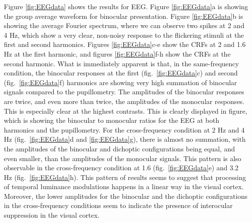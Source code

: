 \documentclass[
]{article}
\begin{document}
Figure \ref{fig:EEGdata} shows the results for EEG. Figure \ref{fig:EEGdata}a is showing the group average waveform for binocular presentation. Figure \ref{fig:EEGdata}b is showing the average Fourier spectrum, where we can observe two spikes at 2 and 4 Hz, which show a very clear, non-noisy response to the flickering stimuli at the first and second harmonics. Figures \ref{fig:EEGdata}c-e show the CRFs at 2 and 1.6 Hz at the first harmonic, and figures \ref{fig:EEGdata}f-h show the CRFs at the second harmonic.
What is immediately apparent is that, in the same-frequency condition, the binocular responses at the first (fig.~\ref{fig:EEGdata}c) and second (fig.~\ref{fig:EEGdata}f) harmonics are showing very high summation of binocular signals compared to the pupillometry. The amplitudes of the binocular responses are twice, and even more than twice, the amplitudes of the monocular responses. This is especially clear at the highest contrasts. This is clearly displayed in figure, which is showing the binocular to monocular ratios for the EEG at both harmonics and the pupillometry. For the cross-frequency condition at 2 Hz and 4 Hz (fig.~\ref{fig:EEGdata}d and \ref{fig:EEGdata}g), there is almost no summation, with the amplitudes of the binocular and dichoptic configurations being equal, and even smaller, than the amplitudes of the monocular signals. This pattern is also observable in the cross-frequency condition at 1.6 (fig.~\ref{fig:EEGdata}e) and 3.2 Hz (fig.~\ref{fig:EEGdata}h). This pattern of results seems to suggest that processing of temporal luminance modulations happens in a linear way in the visual cortex. Moreover, the lower amplitudes for the binocular and the dichoptic configurations in the cross-frequency conditions seem to indicate the presence of interocular suppression in the visual cortex.
\end{document}
